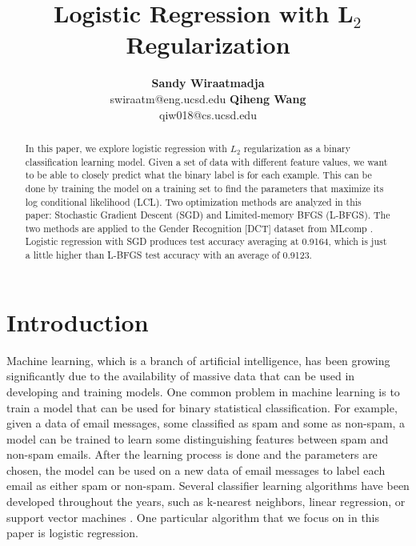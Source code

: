 \documentclass{article} %
\title{\bf Logistic Regression with L$_2$ Regularization}
\author{\textbf{Sandy Wiraatmadja}\\
swiraatm@eng.ucsd.edu
\And
\textbf{Qiheng Wang}\\
qiw018@cs.ucsd.edu}
\begin{document}
\maketitle


\begin{abstract}
In this paper, we explore logistic regression with $L_2$ regularization as a binary classification learning model. Given a set of data with different feature values, we want to be able to closely predict what the binary label is for each example. This can be done by training the model on a training set to find the parameters that maximize its log conditional likelihood (LCL). Two optimization methods are analyzed in this paper: Stochastic Gradient Descent (SGD) and Limited-memory BFGS (L-BFGS). The two methods are applied to the Gender Recognition [DCT] dataset from MLcomp \cite{DCTdata}. Logistic regression with SGD produces test accuracy averaging at 0.9164, which is just a little higher than L-BFGS test accuracy with an average of 0.9123.


\end{abstract}


\section{Introduction}
\label{sec:intro}

Machine learning, which is a branch of artificial intelligence, has been growing significantly due to the availability of massive data that can be used in developing and training models. One common problem in machine learning is to train a model that can be used for binary statistical classification. For example, given a data of email messages, some classified as spam and some as non-spam, a model can be trained to learn some distinguishing features between spam and non-spam emails. After the learning process is done and the parameters are chosen, the model can be used on a new data of email messages to label each email as either spam or non-spam. Several classifier learning algorithms have been developed throughout the years, such as k-nearest neighbors, linear regression, or support vector machines \cite{wiki_classifier}. One particular algorithm that we focus on in this paper is logistic regression.

\end{document}
